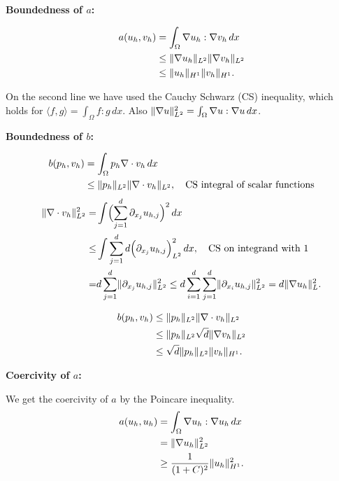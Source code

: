 \documentclass[a4paper,12pt]{article}
\theoremstyle{exerciseStyle}
\theoremstyle{solutionStyle}
\DeclarePairedDelimiter\norm{\lVert}{\rVert}%
\begin{document}
\begin{solution}{6.1}
    \medskip\noindent\textbf{Boundedness of \( a \):}

    \begin{align*}
        a(u_h, v_h) & = \int_{\Omega} \nabla u_h : \nabla v_h \, dx        \\
                    & \leq \norm{\nabla u_h}_{L^2} \norm{\nabla v_h}_{L^2} \\
                    & \leq \norm{u_h}_{H^1} \norm{v_h}_{H^1}.
    \end{align*}

    On the second line we have used the Cauchy Schwarz (CS) inequality, which holds for
    \( \langle f, g \rangle = \int_{\Omega} f : g \, dx\).
    Also \( \norm{\nabla u}_{L^2}^2 =  \int_{\Omega} \nabla u : \nabla u \, dx \).


    \medskip\noindent\textbf{Boundedness of \( b \):}

    \begin{align*}
        b(p_h, v_h) & = \int_{\Omega} p_h \nabla \cdot v_h \, dx          \\
                    & \leq \norm{p_h}_{L^2} \norm{\nabla \cdot v_h}_{L^2}
        ,\quad \text{CS integral of scalar functions}                     \\
    \end{align*}
    \begin{align*}
        \norm{\nabla \cdot v_h}_{L^2}^2 = & \int \Bigl(\sum_{j=1}^d \partial_{x_j} u_{h,j}\Bigr)^2\,dx            \\
        \leq                              & \int  \sum_{j=1}^d  d \Bigl(\partial_{x_j} u_{h,j}\Bigr)^2_{L^2}\,dx,
        \quad \text{CS on integrand with 1}                                                                       \\
        =                                 & d \sum_{j=1}^d \norm{\partial_{x_j} u_{h,j}}^2_{L^2}
        \leq d \sum_{i=1}^d \sum_{j=1}^d \norm{\partial_{x_i} u_{h,j}}^2_{L^2} = d \norm{\nabla u_h}^2_{L}.
    \end{align*}

    \begin{align*}
        b(p_h, v_h) & \leq \norm{p_h}_{L^2} \norm{\nabla \cdot v_h}_{L^2}    \\
                    & \leq \norm{p_h}_{L^2} \sqrt{d} \norm{\nabla v_h}_{L^2} \\
                    & \leq \sqrt{d} \norm{p_h}_{L^2} \norm{v_h}_{H^1}.
    \end{align*}

    \medskip\noindent\textbf{Coercivity of \( a \):}

    We get the coercivity of \( a \) by the Poincare inequality.
    \begin{align*}
        a(u_h, u_h) & = \int_{\Omega} \nabla u_h : \nabla u_h \, dx \\
                    & = \norm{\nabla u_h}_{L^2}^2                   \\
                    & \geq \frac{1}{(1+C)^2} \norm{u_h}_{H^1}^2.
    \end{align*}

\end{solution}
\end{document}
